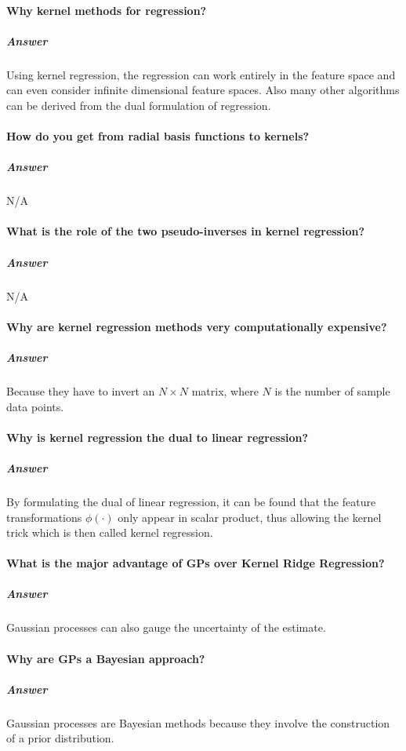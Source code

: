 \documentclass[a4paper, 11pt, accentcolor = tud3b]{tudreport}
\newcommand{\answer}[1]{\subparagraph{Answer} #1}
\begin{document}
			\paragraph{Why kernel methods for regression?}
			\answer{Using kernel regression, the regression can work entirely in the feature space and can even consider infinite dimensional feature spaces. Also many other algorithms can be derived from the dual formulation of regression.}

			\paragraph{How do you get from radial basis functions to kernels?}
			\answer{N/A} %

			\paragraph{What is the role of the two pseudo-inverses in kernel regression?}
			\answer{N/A} %

			\paragraph{Why are kernel regression methods very computationally expensive?}
			\answer{Because they have to invert an \( N \times N \) matrix, where \(N\) is the number of sample data points.}

			\paragraph{Why is kernel regression the dual to linear regression?}
			\answer{By formulating the dual of linear regression, it can be found that the feature transformations \(\phi(\cdot)\) only appear in scalar product, thus allowing the kernel trick which is then called kernel regression.}

			\paragraph{What is the major advantage of GPs over Kernel Ridge Regression?}
			\answer{Gaussian processes can also gauge the uncertainty of the estimate.}

			\paragraph{Why are GPs a Bayesian approach?}
			\answer{Gaussian processes are Bayesian methods because they involve the construction of a prior distribution.}
\end{document}
